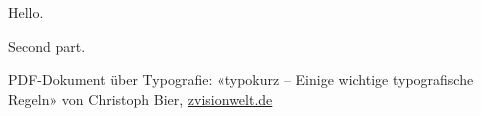 \documentclass{article}
\begin{document}
\noindent
\setlength{\fboxsep}{0pt}

\noindent
{}

\noindent
\begin{minipage}{\textwidth}
 \parbox{.2\textwidth}{Hello.}
 \parbox{\dimexpr \textwidth-.2\textwidth}{Second part.}
\end{minipage}


\noindent
\begin{minipage}{\textwidth}
 \parbox[t]{1.2cm}{  }
 \parbox[t]{\dimexpr \textwidth-1.2cm}{PDF-Dokument über Typografie: «typokurz -- Einige wichtige typografische Regeln» von Christoph Bier, \href{http://www.zvisionwelt.de}{zvisionwelt.de} }
\end{minipage}
\end{document}
